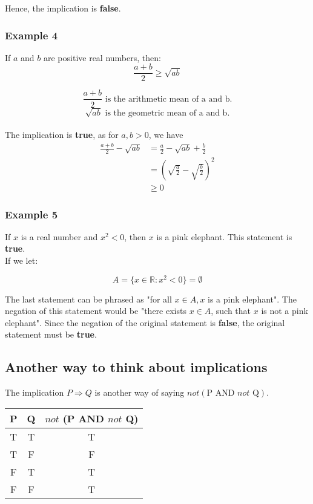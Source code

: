 \documentclass[11pt]{article}
\begin{document}
Hence, the implication is \textbf{false}.

\newpage

\subsubsection{Example 4}
\label{sec:orgd8c4e73}

If \(a\) and \(b\) are positive real numbers, then:
\[\frac{a + b}{2} \ge \sqrt{ab}\]

\[\frac{a + b}{2} \text{ is the arithmetic mean of a and b.}\]
\[\sqrt{ab} \text{ is the geometric mean of a and b.}\]
\\[0pt]

The implication is \textbf{true}, as for \(a, b > 0\), we have
\begin{align*}
\frac{a + b}{2} - \sqrt{ab} &= \frac{a}{2} - \sqrt{ab} + \frac{b}{2} \\
&= (\sqrt{\frac{a}{2}} - \sqrt{\frac{b}{2}})^2 \\
&\ge 0
\end{align*}

\subsubsection{Example 5}
\label{sec:orgf93c842}

If \(x\) is a real number and \(x^2 < 0\), then \(x\) is a pink elephant. This statement is \textbf{true}.
\\[0pt]

If we let:

\[A = \{x \in \mathbb{R} : x^2 < 0\} = \emptyset\]

The last statement can be phrased as "for all \(x \in A, x\) is a pink elephant". The negation of this statement would be "there exists \(x \in A\), such that \(x\) is not a pink elephant". Since the negation of the original statement is \textbf{false}, the original statement must be \textbf{true}.

\newpage

\subsection{Another way to think about implications}
\label{sec:orgb28d8a8}
The implication \(P \Rightarrow Q\) is another way of saying \(not (\text{P AND } not \text{ Q})\).

\begin{center}
\begin{tabular}{ |c|c|c| }
\hline
P & Q & $not$ (P AND $not$ Q) \\
\hline
T & T & T \\
\hline
T & F & F \\
\hline
F & T & T \\
\hline
F & F & T \\
\hline
\end{tabular}
\end{center}
\end{document}
